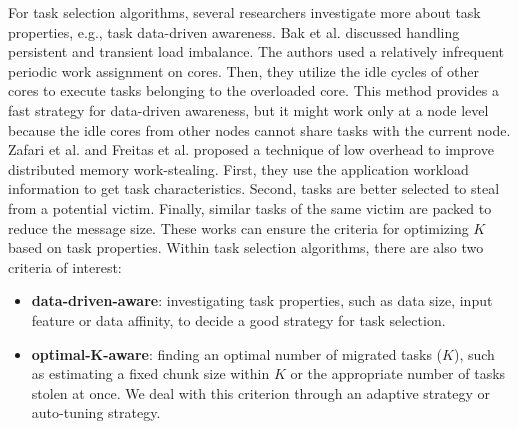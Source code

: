 For task selection algorithms, several researchers investigate more about task properties, e.g., task data-driven awareness. Bak et al. \cite{bak2018multi} discussed handling persistent and transient load imbalance. The authors used a relatively infrequent periodic work assignment on cores. Then, they utilize the idle cycles of other cores to execute tasks belonging to the overloaded core. This method provides a fast strategy for data-driven awareness, but it might work only at a node level because the idle cores from other nodes cannot share tasks with the current node. Zafari et al. \cite{zafari2018distributed} and Freitas et al. \cite{freitas2021packsteallb} proposed a technique of low overhead to improve distributed memory work-stealing. First, they use the application workload information to get task characteristics. Second, tasks are better selected to steal from a potential victim. Finally, similar tasks of the same victim are packed to reduce the message size. These works can ensure the criteria for optimizing $K$ based on task properties. Within task selection algorithms, there are also two criteria of interest:
\begin{itemize}
	\item \textbf{data-driven-aware}: investigating task properties, such as data size, input feature or data affinity, to decide a good strategy for task selection.
	\item \textbf{optimal-K-aware}: finding an optimal number of migrated tasks ($K$), such as estimating a fixed chunk size within $K$ or the appropriate number of tasks stolen at once. We deal with this criterion through an adaptive strategy or auto-tuning strategy.
\end{itemize}

